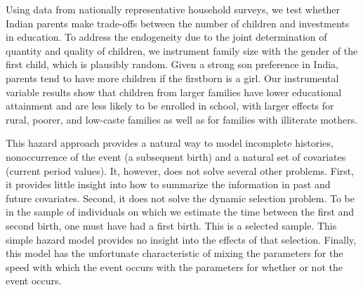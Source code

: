 \citep{Kugler2017}

Using data from nationally representative household surveys, we test
whether Indian parents make trade-offs between the number of children
and investments in education. To address the endogeneity due to the
joint determination of quantity and quality of children, we instrument
family size with the gender of the first child, which is plausibly
random. Given a strong son preference in India, parents tend to have
more children if the firstborn is a girl. Our instrumental variable
results show that children from larger families have lower educational
attainment and are less likely to be enrolled in school, with larger
effects for rural, poorer, and low-caste families as well as for
families with illiterate mothers.

\citep{Hotz1997}

This hazard approach provides a natural way to model incomplete
histories, nonoccurrence of the event (a subsequent birth) and a natural
set of covariates (current period values). It, however, does not solve
several other problems. First, it provides
little insight into how to summarize the information in past and future
covariates. Second, it does not solve the dynamic selection problem. To
be in the sample of individuals on which we estimate the time between
the first and second birth, one must have had a first birth. This is a
selected sample. This simple hazard model provides no insight into the
effects of that selection. Finally, this model has the unfortunate
characteristic of mixing the parameters for the speed with which the
event occurs with the parameters for whether or not the event occurs.


